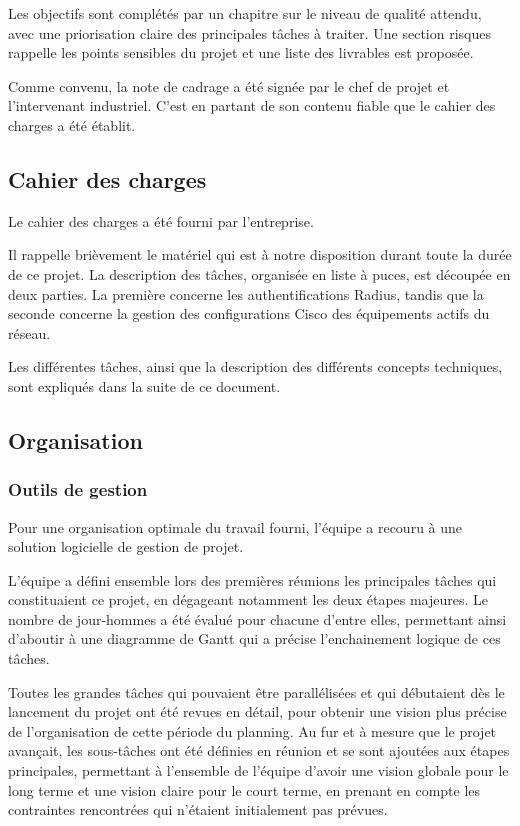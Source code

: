 Les objectifs sont complétés par un chapitre sur le niveau de qualité attendu, avec une priorisation claire des principales tâches à traiter. Une section risques rappelle les points sensibles du projet et une liste des livrables est proposée.

Comme convenu, la note de cadrage a été signée par le chef de projet et l'intervenant industriel. C'est en partant de son contenu fiable que le cahier des charges a été établit.

\subsection{Cahier des charges}

Le cahier des charges a été fourni par l'entreprise.

Il rappelle brièvement le matériel qui est à notre disposition durant toute la durée de ce projet. La description des tâches, organisée en liste à puces, est découpée en deux parties. La première concerne les authentifications Radius, tandis que la seconde concerne la gestion des configurations Cisco des équipements actifs du réseau.

Les différentes tâches, ainsi que la description des différents concepts techniques, sont expliqués dans la suite de ce document.

\subsection{Organisation}
\subsubsection{Outils de gestion}

Pour une organisation optimale du travail fourni, l'équipe a recouru à une solution logicielle de gestion de projet.

L'équipe a défini ensemble lors des premières réunions les principales tâches qui constituaient ce projet, en dégageant notamment les deux étapes majeures. Le nombre de jour-hommes a été évalué pour chacune d'entre elles, permettant ainsi d'aboutir à une diagramme de Gantt qui a précise l'enchainement logique de ces tâches.

Toutes les grandes tâches qui pouvaient être parallélisées et qui débutaient dès le lancement du projet ont été revues en détail, pour obtenir une vision plus précise de l'organisation de cette période du planning. Au fur et à mesure que le projet avançait, les sous-tâches ont été définies en réunion et se sont ajoutées aux étapes principales, permettant à l'ensemble de l'équipe d'avoir une vision globale pour le long terme et une vision claire pour le court terme, en prenant en compte les contraintes rencontrées qui n'étaient initialement pas prévues.

